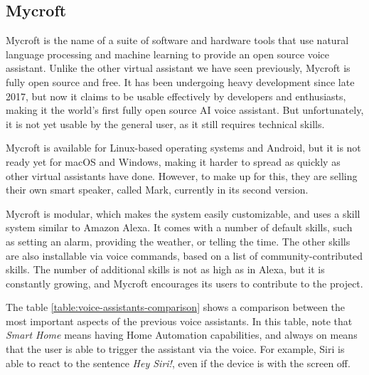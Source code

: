 \subsection{Mycroft}
Mycroft is the name of a suite of software and hardware tools that use natural language processing and machine learning to provide
an open source voice assistant.\cite{mycroftDocumentation} Unlike the other virtual assistant we have seen previously, Mycroft is
fully open source and free. It has been undergoing heavy development since late 2017, but now it claims to be usable effectively
by developers and enthusiasts, making it the world's first fully open source AI voice assistant. But unfortunately, it is not yet usable
by the general user, as it still requires technical skills.

Mycroft is available for Linux-based operating systems and Android, but it is not ready yet for macOS and Windows, making it harder
to spread as quickly as other virtual assistants have done. However, to make up for this, they are selling their own smart speaker,
called Mark, currently in its second version.

Mycroft is modular, which makes the system easily customizable, and uses a skill system similar to Amazon Alexa. It comes with a
number of default skills, such as setting an alarm, providing the weather, or telling the time. The other skills are also installable via
voice commands, based on a list of community-contributed skills. The number of additional skills is not as high as in Alexa, but it
is constantly growing, and Mycroft encourages its users to contribute to the project.

\bigskip
The table \ref{table:voice-assistants-comparison} shows a comparison between the most important aspects of the previous voice
assistants. In this table, note that \textit{Smart Home} means having Home Automation capabilities, and always on means that the
user is able to trigger the assistant via the voice. For example, Siri is able to react to the sentence \textit{Hey Siri!}, even if the
device is with the screen off.

